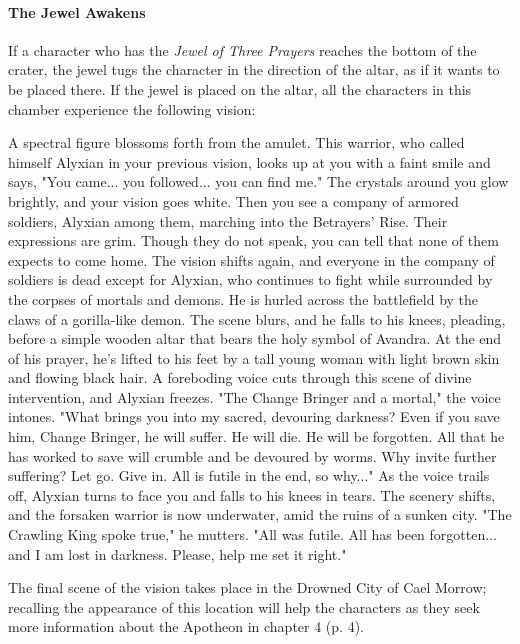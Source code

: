 \documentclass[a4paper, 11pt, bg=full, twocolumn, nooutline]{dndbook}
\begin{document}
\paragraph{The Jewel Awakens}

If a character who has the \textit{Jewel of Three Prayers} reaches the bottom of the crater, the jewel tugs the character in the direction of the altar, as if it wants to be placed there. If the jewel is placed on the altar, all the characters in this chamber experience the following vision:

\begin{DndReadAloud}
A spectral figure blossoms forth from the amulet. This warrior, who called himself Alyxian in your previous vision, looks up at you with a faint smile and says, "You came... you followed... you can find me." The crystals around you glow brightly, and your vision goes white. Then you see a company of armored soldiers, Alyxian among them, marching into the Betrayers' Rise. Their expressions are grim. Though they do not speak, you can tell that none of them expects to come home.
The vision shifts again, and everyone in the company of soldiers is dead except for Alyxian, who continues to fight while surrounded by the corpses of mortals and demons. He is hurled across the battlefield by the claws of a gorilla-like demon. The scene blurs, and he falls to his knees, pleading, before a simple wooden altar that bears the holy symbol of Avandra. At the end of his prayer, he's lifted to his feet by a tall young woman with light brown skin and flowing black hair.
A foreboding voice cuts through this scene of divine intervention, and Alyxian freezes. "The Change Bringer and a mortal," the voice intones. "What brings you into my sacred, devouring darkness? Even if you save him, Change Bringer, he will suffer. He will die. He will be forgotten. All that he has worked to save will crumble and be devoured by worms. Why invite further suffering? Let go. Give in. All is futile in the end, so why..."
As the voice trails off, Alyxian turns to face you and falls to his knees in tears. The scenery shifts, and the forsaken warrior is now underwater, amid the ruins of a sunken city. "The Crawling King spoke true," he mutters. "All was futile. All has been forgotten... and I am lost in darkness. Please, help me set it right."
\end{DndReadAloud}

The final scene of the vision takes place in the Drowned City of Cael Morrow; recalling the appearance of this location will help the characters as they seek more information about the Apotheon in chapter 4 (p. 4).
\end{document}
